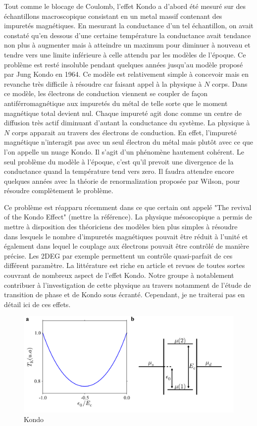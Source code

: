 Tout comme le blocage de Coulomb, l'effet Kondo a d'abord été mesuré sur des échantillons macroscopique consistant en un metal massif contenant des impuretés magnétiques. En mesurant la conductance d'un tel échantillon, on avait constaté  qu'en dessous d'une certaine température la conductance avait tendance non plus à augmenter mais à atteindre un maximum pour diminuer à nouveau et tendre vers une limite inférieure à celle attendu par les modèles de l'époque. Ce problème est resté insoluble pendant quelques années jusqu'au modèle proposé par Jung Kondo en 1964. Ce modèle est relativement simple à concevoir mais en revanche très difficile à résoudre car faisant appel à la physique à $N$ corps. Dans ce modèle, les électrons de conduction viennent se coupler de façon antiférromagnétique aux impuretés du métal de telle sorte que le moment magnétique total devient nul. Chaque impureté agit donc comme un centre de diffusion très actif diminuant d'autant la conductance du système. La physique à $N$ corps apparait au travers des électrons de conduction. En effet, l'impureté magnétique n'interagit pas avec un seul électron du métal mais plutôt avec ce que l'on appelle un nuage Kondo. Il s'agit d'un phénomène hautement cohérent. Le seul problème du modèle à l'époque, c'est qu'il prevoit une divergence de la conductance quand la température tend vers zero. Il faudra attendre encore quelques années avec la théorie de renormalization proposée par Wilson, pour résoudre complètement le problème.

Ce problème est réapparu récemment dans ce que certain ont appelé "The revival of the Kondo Effect" (mettre la référence). La physique mésoscopique a permis de mettre à disposition des théoriciens des modèles bien plus simples à résoudre dans lesquels le nombre d'impuretés magnétiques pouvait être réduit à l'unité et également dans lequel le couplage aux électrons pouvait être contrôlé de manière précise. Les 2DEG par exemple permettent un contrôle quasi-parfait de ces différent paramètre. La littérature est riche en article et revues de toutes sortes couvrant de nombreux aspect de l'effet Kondo. Notre groupe à notablement contribuer à l'investigation de cette physique au travers notamment de l'étude de transition de phase et de Kondo sous écranté. Cependant, je ne traiterai pas en détail ici de ces effets.

\begin{figure}
\includegraphics[scale=0.5]{Theorie/Transport/figure6/figure6.pdf} 
\caption{Kondo}
\label{Kondo_param}
\end{figure}


